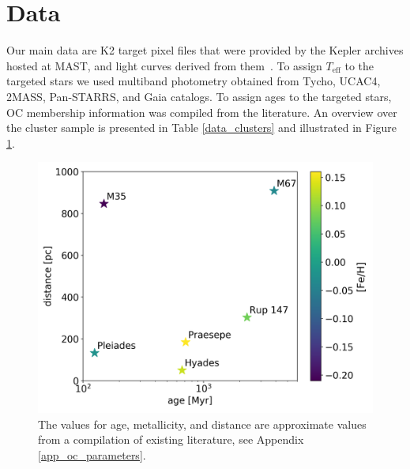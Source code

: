 \documentclass{aa}
\begin{document}
\section{Data}
Our main data are K2 target pixel files that were provided by the Kepler archives hosted at MAST, and light curves derived from them~\citep{aigrain_k2sc_2016, soares_furtado_m35_2017, lightkurve}. To assign $T_\mathrm{eff}$ to the targeted stars we used multiband photometry obtained from Tycho, UCAC4, 2MASS, Pan-STARRS, and Gaia catalogs. To assign ages to the targeted stars,  OC membership information was compiled from the literature. An overview over the cluster sample is presented in Table \ref{data_clusters} and illustrated in Figure \ref{OCs}.

     \begin{figure}
            \includegraphics[width=\hsize]{pics/clusters/openclusters_logage_vs_distance.png}
         \caption{The values for age, metallicity, and distance are approximate values from a compilation of existing literature, see Appendix \ref{app_oc_parameters}.}
         \label{OCs}
   \end{figure}
\end{document}
